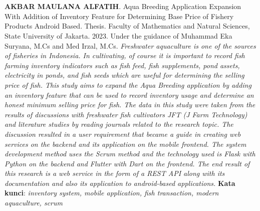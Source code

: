 \chapter*{}

\begin{spacing}{1}
\textbf{AKBAR MAULANA ALFATIH}. Aqua Breeding Application Expansion With Addition of Inventory Feature for Determining Base Price of Fishery Products Android Based. Thesis. Faculty of Mathematics and Natural Sciences, State University of Jakarta. 2023. Under the guidance of Muhammad Eka Suryana, M.Cs and Med Irzal, M.Cs.
\newline
\newline
\textit{Freshwater aquaculture is one of the sources of fisheries in Indonesia. In cultivating, of course it is important to record fish farming inventory indicators such as fish feed, fish supplements, pond assets, electricity in ponds, and fish seeds which are useful for determining the selling price of fish. This study aims to expand the Aqua Breeding application by adding an inventory feature that can be used to record inventory usage and determine an honest minimum selling price for fish. The data in this study were taken from the results of discussions with freshwater fish cultivators JFT (J Farm Technology) and literature studies by reading journals related to the research topic. The discussion resulted in a user requirement that became a guide in creating web services on the backend and its application on the mobile frontend. The system development method uses the Scrum method and the technology used is Flask with Python on the backend and Flutter with Dart on the frontend. The end result of this research is a web service in the form of a REST API along with its documentation and also its application to android-based applications.}
\newline
\newline
\noindent \textbf{Kata kunci}: \textit{inventory system, mobile application, fish transaction, modern aquaculture, scrum}
\end{spacing}